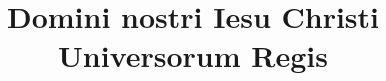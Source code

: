 \documentclass[17pt]{extarticle}
\begin{document}
\title{Domini nostri Iesu Christi Universorum Regis}
\makereadingtitle

\end{document}
